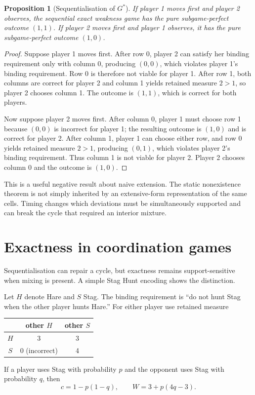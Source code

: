 \documentclass[11pt]{article}
\newtheorem{proposition}[theorem]{Proposition}
\theoremstyle{definition}
\begin{document}
\begin{proposition}[Sequentialisation of $G^*$]\label{prop:gstar-seq}
If player 1 moves first and player 2 observes, the sequential exact weakness game has the pure subgame-perfect outcome $(1,1)$. If player 2 moves first and player 1 observes, it has the pure subgame-perfect outcome $(1,0)$.
\end{proposition}

\begin{proof}
Suppose player 1 moves first. After row 0, player 2 can satisfy her binding requirement only with column 0, producing $(0,0)$, which violates player 1's binding requirement. Row 0 is therefore not viable for player 1. After row 1, both columns are correct for player 2 and column 1 yields retained measure $2>1$, so player 2 chooses column 1. The outcome is $(1,1)$, which is correct for both players.

Now suppose player 2 moves first. After column 0, player 1 must choose row 1 because $(0,0)$ is incorrect for player 1; the resulting outcome is $(1,0)$ and is correct for player 2. After column 1, player 1 can choose either row, and row 0 yields retained measure $2>1$, producing $(0,1)$, which violates player 2's binding requirement. Thus column 1 is not viable for player 2. Player 2 chooses column 0 and the outcome is $(1,0)$.
\end{proof}

This is a useful negative result about naive extension. The static nonexistence theorem is not simply inherited by an extensive-form representation of the same cells. Timing changes which deviations must be simultaneously supported and can break the cycle that required an interior mixture.

\section{Exactness in coordination games}

Sequentialisation can repair a cycle, but exactness remains support-sensitive when mixing is present. A simple Stag Hunt encoding shows the distinction.

Let $H$ denote Hare and $S$ Stag. The binding requirement is ``do not hunt Stag when the other player hunts Hare.'' For either player use retained measure
\begin{center}
\begin{tabular}{c|cc}
 & other $H$ & other $S$\\
\hline
$H$ & 3 & 3\\
$S$ & 0 (incorrect) & 4
\end{tabular}
\end{center}
If a player uses Stag with probability $p$ and the opponent uses Stag with probability $q$, then
\[
c=1-p(1-q),
\qquad
W=3+p(4q-3).
\]
\end{document}
